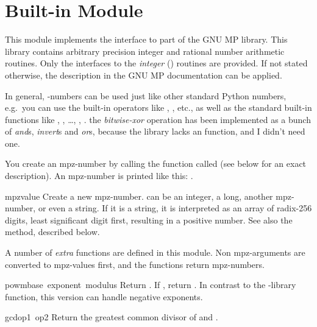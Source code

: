 \section{Built-in Module }

This module implements the interface to part of the GNU MP library.
This library contains arbitrary precision integer and rational number
arithmetic routines. Only the interfaces to the \emph{integer}
() routines are provided. If not stated
otherwise, the description in the GNU MP documentation can be applied.

In general, -numbers can be used just like other standard
Python numbers, e.g.\ you can use the built-in operators like \code{+},
\code{*}, etc., as well as the standard built-in functions like
, , \ldots, , .
 the {\it bitwise-xor} operation has been implemented as
a bunch of {\it and}s, {\it invert}s and {\it or}s, because the library
lacks an  function, and I didn't need one.

You create an mpz-number by calling the function called  (see
below for an exact description). An mpz-number is printed like this:
.

\renewcommand{\indexsubitem}{(in module mpz)}
\begin{funcdesc}{mpz}{value}
  Create a new mpz-number.  can be an integer, a long,
  another mpz-number, or even a string. If it is a string, it is
  interpreted as an array of radix-256 digits, least significant digit
  first, resulting in a positive number. See also the 
  method, described below.
\end{funcdesc}

A number of {\em extra} functions are defined in this module. Non
mpz-arguments are converted to mpz-values first, and the functions
return mpz-numbers.

\begin{funcdesc}{powm}{base\, exponent\, modulus}
  Return . If
  , return . In contrast to the
  \C-library function, this version can handle negative exponents.
\end{funcdesc}

\begin{funcdesc}{gcd}{op1\, op2}
  Return the greatest common divisor of  and .
\end{funcdesc}

